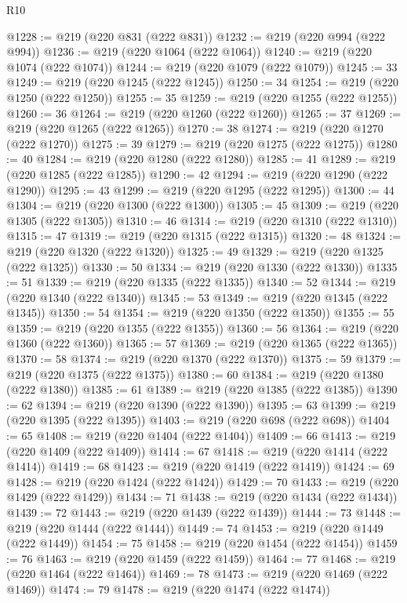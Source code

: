 \begin{lexlean}{R10}
\begin{coremodule}
{{{{{{{{{{{{{{{{{{{{{{{{{{{{{{{{{{{{{{{{{{{{{{{{{{{{{{{{{{{{{{{{{{{{{{{{{{{{{{{{{{{{{{{{{{{{{{{{{{{{{{{{{{{{@1228 := @219 (@220 @831 (@222 @831))
@1232 := @219 (@220 @994 (@222 @994))
@1236 := @219 (@220 @1064 (@222 @1064))
@1240 := @219 (@220 @1074 (@222 @1074))
@1244 := @219 (@220 @1079 (@222 @1079))
@1245 := 33
@1249 := @219 (@220 @1245 (@222 @1245))
@1250 := 34
@1254 := @219 (@220 @1250 (@222 @1250))
@1255 := 35
@1259 := @219 (@220 @1255 (@222 @1255))
@1260 := 36
@1264 := @219 (@220 @1260 (@222 @1260))
@1265 := 37
@1269 := @219 (@220 @1265 (@222 @1265))
@1270 := 38
@1274 := @219 (@220 @1270 (@222 @1270))
@1275 := 39
@1279 := @219 (@220 @1275 (@222 @1275))
@1280 := 40
@1284 := @219 (@220 @1280 (@222 @1280))
@1285 := 41
@1289 := @219 (@220 @1285 (@222 @1285))
@1290 := 42
@1294 := @219 (@220 @1290 (@222 @1290))
@1295 := 43
@1299 := @219 (@220 @1295 (@222 @1295))
@1300 := 44
@1304 := @219 (@220 @1300 (@222 @1300))
@1305 := 45
@1309 := @219 (@220 @1305 (@222 @1305))
@1310 := 46
@1314 := @219 (@220 @1310 (@222 @1310))
@1315 := 47
@1319 := @219 (@220 @1315 (@222 @1315))
@1320 := 48
@1324 := @219 (@220 @1320 (@222 @1320))
@1325 := 49
@1329 := @219 (@220 @1325 (@222 @1325))
@1330 := 50
@1334 := @219 (@220 @1330 (@222 @1330))
@1335 := 51
@1339 := @219 (@220 @1335 (@222 @1335))
@1340 := 52
@1344 := @219 (@220 @1340 (@222 @1340))
@1345 := 53
@1349 := @219 (@220 @1345 (@222 @1345))
@1350 := 54
@1354 := @219 (@220 @1350 (@222 @1350))
@1355 := 55
@1359 := @219 (@220 @1355 (@222 @1355))
@1360 := 56
@1364 := @219 (@220 @1360 (@222 @1360))
@1365 := 57
@1369 := @219 (@220 @1365 (@222 @1365))
@1370 := 58
@1374 := @219 (@220 @1370 (@222 @1370))
@1375 := 59
@1379 := @219 (@220 @1375 (@222 @1375))
@1380 := 60
@1384 := @219 (@220 @1380 (@222 @1380))
@1385 := 61
@1389 := @219 (@220 @1385 (@222 @1385))
@1390 := 62
@1394 := @219 (@220 @1390 (@222 @1390))
@1395 := 63
@1399 := @219 (@220 @1395 (@222 @1395))
@1403 := @219 (@220 @698 (@222 @698))
@1404 := 65
@1408 := @219 (@220 @1404 (@222 @1404))
@1409 := 66
@1413 := @219 (@220 @1409 (@222 @1409))
@1414 := 67
@1418 := @219 (@220 @1414 (@222 @1414))
@1419 := 68
@1423 := @219 (@220 @1419 (@222 @1419))
@1424 := 69
@1428 := @219 (@220 @1424 (@222 @1424))
@1429 := 70
@1433 := @219 (@220 @1429 (@222 @1429))
@1434 := 71
@1438 := @219 (@220 @1434 (@222 @1434))
@1439 := 72
@1443 := @219 (@220 @1439 (@222 @1439))
@1444 := 73
@1448 := @219 (@220 @1444 (@222 @1444))
@1449 := 74
@1453 := @219 (@220 @1449 (@222 @1449))
@1454 := 75
@1458 := @219 (@220 @1454 (@222 @1454))
@1459 := 76
@1463 := @219 (@220 @1459 (@222 @1459))
@1464 := 77
@1468 := @219 (@220 @1464 (@222 @1464))
@1469 := 78
@1473 := @219 (@220 @1469 (@222 @1469))
@1474 := 79
@1478 := @219 (@220 @1474 (@222 @1474))
}}}}}}}}}}}}}}}}}}}}}}}}}}}}}}}}}}}}}}}}}}}}}}}}}}}}}}}}}}}}}}}}}}}}}}}}}}}}}}}}}}}}}}}}}}}}}}}}}}}}}}}}}}}}
\end{coremodule}
\end{lexlean}
